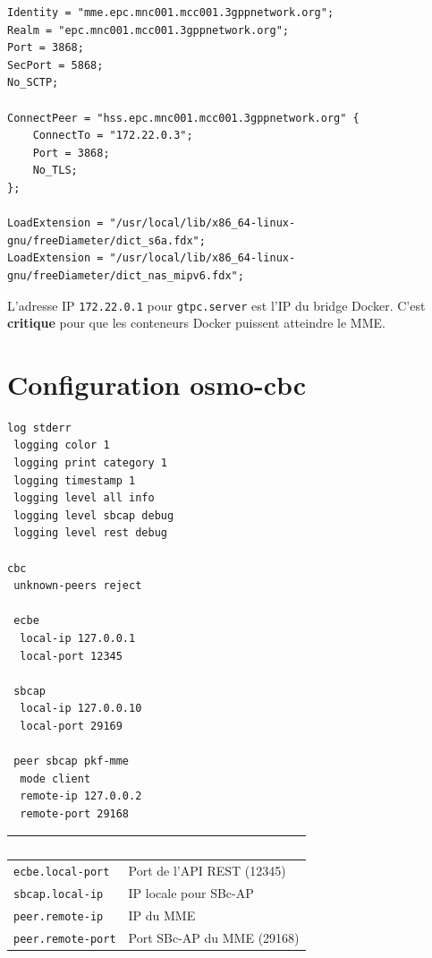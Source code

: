\documentclass[11pt,a4paper]{article}
\newcommand{\ip}[1]{\texttt{\color{pkfblue}#1}}
\begin{document}
\begin{filebox}
\begin{lstlisting}[style=confstyle]
Identity = "mme.epc.mnc001.mcc001.3gppnetwork.org";
Realm = "epc.mnc001.mcc001.3gppnetwork.org";
Port = 3868;
SecPort = 5868;
No_SCTP;

ConnectPeer = "hss.epc.mnc001.mcc001.3gppnetwork.org" { 
    ConnectTo = "172.22.0.3"; 
    Port = 3868; 
    No_TLS; 
};

LoadExtension = "/usr/local/lib/x86_64-linux-gnu/freeDiameter/dict_s6a.fdx";
LoadExtension = "/usr/local/lib/x86_64-linux-gnu/freeDiameter/dict_nas_mipv6.fdx";
\end{lstlisting}
\end{filebox}

\begin{warnbox}
L'adresse IP \ip{172.22.0.1} pour \texttt{gtpc.server} est l'IP du bridge Docker. C'est \textbf{critique} pour que les conteneurs Docker puissent atteindre le MME.
\end{warnbox}

\newpage

\section{Configuration osmo-cbc}

\begin{filebox}
\begin{lstlisting}[style=confstyle]
log stderr
 logging color 1
 logging print category 1
 logging timestamp 1
 logging level all info
 logging level sbcap debug
 logging level rest debug

cbc
 unknown-peers reject
 
 ecbe
  local-ip 127.0.0.1
  local-port 12345
 
 sbcap
  local-ip 127.0.0.10
  local-port 29169
 
 peer sbcap pkf-mme
  mode client
  remote-ip 127.0.0.2
  remote-port 29168
\end{lstlisting}
\end{filebox}

\begin{center}
\begin{tabular}{|l|l|}
\hline
\rowcolor{pkfblue}
\textcolor{white}{\textbf{Paramètre}} & \textcolor{white}{\textbf{Description}} \\
\hline
\texttt{ecbe.local-port} & Port de l'API REST (12345) \\
\hline
\texttt{sbcap.local-ip} & IP locale pour SBc-AP \\
\hline
\texttt{peer.remote-ip} & IP du MME \\
\hline
\texttt{peer.remote-port} & Port SBc-AP du MME (29168) \\
\hline
\end{tabular}
\end{center}
\end{document}
